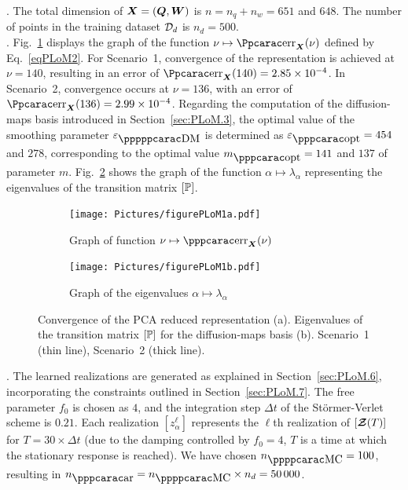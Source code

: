 .
The total dimension of ${\boldsymbol{X}} = ({\boldsymbol{Q}},{\boldsymbol{W}})$ is $n = n_q + n_w = 651$ and $648$. The number of points in the training dataset ${\mathcal{D}}_d$ is $n_d=500$.\\

.
Fig.~\ref{fig:figurePLoM1a} displays the graph of the function  $\nu\mapsto \err_\bfX(\nu)$ defined by Eq.~\eqref{eqPLoM2}.
For Scenario~1, convergence of the representation is achieved at $\nu=140$, resulting in an error of $\err_\bfX(140) = 2.85\times 10^{-4}$. In
Scenario~2, convergence occurs at $\nu=136$,  with an error of $\err_\bfX(136) = 2.99\times 10^{-4}$.
%
Regarding  the computation of the diffusion-maps basis introduced in Section~\ref{sec:PLoM.3}, the optimal value of the smoothing parameter $\varepsilon_\DM$ is determined as $\varepsilon_\opt = 454$ and $278$, corresponding to the optimal value $m_\opt = 141$ and $137$ of parameter $m$. Fig.~\ref{fig:figurePLoM1b} shows the graph of the function $\alpha\mapsto \lambda_\alpha$ representing  the eigenvalues of the transition matrix $[{\mathbb{P}}]$.\\
%
%
\begin{figure}[!htb]
    \centering
    \begin{subfigure}[b]{0.40\textwidth}
    \centering
        \texttt{[image: Pictures/figurePLoM1a.pdf]}
        \caption{Graph of function $\nu\mapsto \errpp_\bfX(\nu)$}
        \label{fig:figurePLoM1a}
    \end{subfigure}
    \centering
    \begin{subfigure}[b]{0.40\textwidth}
    \centering
        \texttt{[image: Pictures/figurePLoM1b.pdf]}
        \caption{Graph of the eigenvalues $\alpha\mapsto \lambda_\alpha$}
        \label{fig:figurePLoM1b}
    \end{subfigure}
    \caption{Convergence of the PCA reduced representation (a). Eigenvalues of the transition matrix $[{\mathbb{P}}]$ for the diffusion-maps basis (b). Scenario~1 (thin line), Scenario~2 (thick line).}
    \label{fig:figurePLoM1}
\end{figure}

.
The learned realizations are generated as explained in Section~\ref{sec:PLoM.6}, incorporating the constraints outlined in Section~\ref{sec:PLoM.7}. The free parameter $f_0$ is chosen as $4$, and the integration step $\Delta t$ of the St\"{o}rmer-Verlet scheme
is $0.21$. Each realization $[z_\alpha^\ell]$ represents  the $\ell$th realization of $[{\boldsymbol{\mathcal{Z}}}(T)]$ for $T = 30 \times \Delta t$ (due to the damping controlled by $f_0=4$, $T$ is a time at which the stationary response is reached). We have chosen $n_\MC = 100$,  resulting in $n_\ar = n_\MC\times n_d = 50\, 000$. \\


